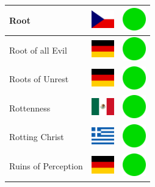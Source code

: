\documentclass[12pt, a4paper, twoside]{report}
\begin{document}
\begin{center}
\begin{longtable}{|p{5cm}|p{2cm}|p{2cm}|}
 Root                                                       & \includegraphics[width=1cm]{../4x3/cz} &   \includegraphics[width=1cm]{../likes/y} \\ \hline
 Root of all Evil                                           & \includegraphics[width=1cm]{../4x3/de} &   \includegraphics[width=1cm]{../likes/y} \\ \hline
 Roots of Unrest                                            & \includegraphics[width=1cm]{../4x3/de} &   \includegraphics[width=1cm]{../likes/y} \\ \hline
 Rottenness                                                 & \includegraphics[width=1cm]{../4x3/mx} &   \includegraphics[width=1cm]{../likes/y} \\ \hline
 Rotting Christ                                             & \includegraphics[width=1cm]{../4x3/gr} &   \includegraphics[width=1cm]{../likes/y} \\ \hline
 Ruins of Perception                                        & \includegraphics[width=1cm]{../4x3/de} &   \includegraphics[width=1cm]{../likes/y} \\ \hline

\end{longtable}
\end{center}
\end{document}
